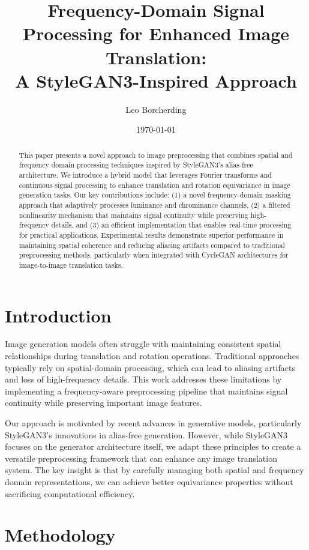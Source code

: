 \documentclass{article}
\title{Frequency-Domain Signal Processing for Enhanced Image Translation: \\
A StyleGAN3-Inspired Approach}
\author{Leo Borcherding}
\date{\today}
\begin{document}
\maketitle

\begin{abstract}
This paper presents a novel approach to image preprocessing that combines spatial and frequency domain processing techniques inspired by StyleGAN3's alias-free architecture. We introduce a hybrid model that leverages Fourier transforms and continuous signal processing to enhance translation and rotation equivariance in image generation tasks. Our key contributions include: (1) a novel frequency-domain masking approach that adaptively processes luminance and chrominance channels, (2) a filtered nonlinearity mechanism that maintains signal continuity while preserving high-frequency details, and (3) an efficient implementation that enables real-time processing for practical applications. Experimental results demonstrate superior performance in maintaining spatial coherence and reducing aliasing artifacts compared to traditional preprocessing methods, particularly when integrated with CycleGAN architectures for image-to-image translation tasks.
\end{abstract}

\section{Introduction}
Image generation models often struggle with maintaining consistent spatial relationships during translation and rotation operations. Traditional approaches typically rely on spatial-domain processing, which can lead to aliasing artifacts and loss of high-frequency details. This work addresses these limitations by implementing a frequency-aware preprocessing pipeline that maintains signal continuity while preserving important image features.

Our approach is motivated by recent advances in generative models, particularly StyleGAN3's innovations in alias-free generation. However, while StyleGAN3 focuses on the generator architecture itself, we adapt these principles to create a versatile preprocessing framework that can enhance any image translation system. The key insight is that by carefully managing both spatial and frequency domain representations, we can achieve better equivariance properties without sacrificing computational efficiency.

\section{Methodology}
\end{document}
